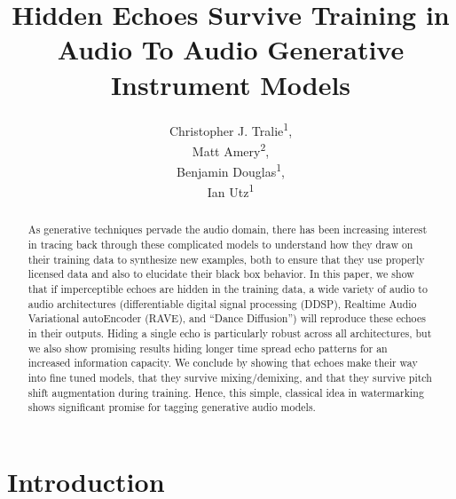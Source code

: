 \documentclass[letterpaper]{article} %
\title{Hidden Echoes Survive Training in Audio To Audio Generative Instrument Models}
\author{
    Christopher J. Tralie\textsuperscript{\rm 1},\\
    Matt Amery\textsuperscript{\rm 2},\\
    Benjamin Douglas\textsuperscript{\rm 1},\\
    Ian Utz\textsuperscript{\rm 1}
}
\begin{document}
\maketitle

\begin{abstract}
As generative techniques pervade the audio domain, there has been increasing interest in tracing back through these complicated models to understand how they draw on their training data to synthesize new examples, both to ensure that they use properly licensed data and also to elucidate their black box behavior. In this paper, we show that if imperceptible echoes are hidden in the training data, a wide variety of audio to audio architectures (differentiable digital signal processing (DDSP), Realtime Audio Variational autoEncoder (RAVE), and ``Dance Diffusion'') will reproduce these echoes in their outputs. Hiding a single echo is particularly robust across all architectures, but we also show promising results hiding longer time spread echo patterns for an increased information capacity. We conclude by showing that echoes make their way into fine tuned models, that they survive mixing/demixing, and that they survive pitch shift augmentation during training. Hence, this simple, classical idea in watermarking shows significant promise for tagging generative audio models. 

\end{abstract}

%

\section{Introduction}
\end{document}
